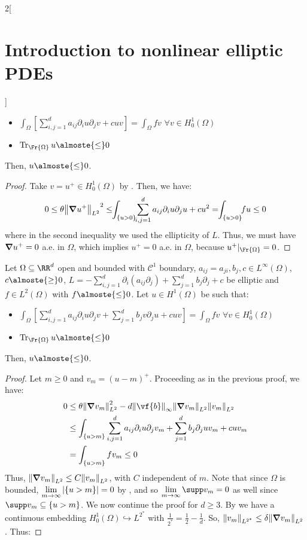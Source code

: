 \documentclass[../../../main_math.tex]{subfiles}
\begin{document}
\begin{multicols}{2}[\section{Introduction to nonlinear elliptic PDEs}]
\begin{theorem}
    \begin{itemize}
      \item $\displaystyle \int_\Omega\left[\sum_{i,j=1}^da_{ij}\partial_iu\partial_jv+cuv\right]=\int_\Omega fv$ $\forall v\in H^1_0(\Omega)$
      \item $\Tr_{\Fr{\Omega}}u\almoste{\leq}0$
    \end{itemize}
    Then, $u\almoste{\leq}0$.
  \end{theorem}
  \begin{proof}
    Take $v=u^+\in H^1_0(\Omega)$ by . Then, we have:
    $$
      0\leq \theta {\norm{\grad u^+}_{L^2}}^2\leq\!\! \int_{\{u>0\}}\!\!\sum_{i,j=1}^d a_{ij}\partial_iu\partial_ju+cu^2=\!\!\int_{\{u>0\}} \!\!fu\leq 0
    $$
    where in the second inequality we used the ellipticity of $L$. Thus, we must have $\grad u^+=0$ a.e. in $\Omega$, which implies $u^+=0$ a.e. in $\Omega$, because $u^+|_{\Fr{\Omega}}=0$.
  \end{proof}
  \begin{theorem}\label{INEPDE:weak_max_principle}
    Let $\Omega\subseteq\RR^d$ open and bounded with $\mathcal{C}^1$ boundary, $a_{ij}=a_{ji},b_j,c\in L^\infty(\Omega)$, $c \almoste{\geq}0$, $L=-\sum_{i,j=1}^d\partial_i(a_{ij}\partial_j)+\sum_{j=1}^db_j\partial_j+c$ be elliptic and $f\in L^2(\Omega)$ with $f\almoste{\leq} 0$. Let $u\in H^1(\Omega)$ be such that:
    \begin{itemize}
      \item $\displaystyle \int_\Omega\left[\sum_{i,j=1}^da_{ij}\partial_iu\partial_jv+ \sum_{j=1}^db_jv\partial_ju+cuv\right]=\int_\Omega fv$ $\forall v\in H^1_0(\Omega)$
      \item $\Tr_{\Fr{\Omega}}u\almoste{\leq}0$
    \end{itemize}
    Then, $u\almoste{\leq}0$.
  \end{theorem}
  \begin{proof}
    Let $m\geq 0$ and $v_m={(u-m)}^+$. Proceeding as in the previous proof, we have:
    \begin{align*}
      0 & \leq \theta \norm{\grad v_m}_{L^2}^2-d\norm{\vf{b}}_\infty\norm{\grad v_m}_{L^2}\norm{v_m}_{L^2}       \\
        & \leq \int_{\{u>m\}}\sum_{i,j=1}^d a_{ij}\partial_iu\partial_jv_m+\sum_{j=1}^db_j\partial_ju v_m+cu v_m \\
        & =\int_{\{u>m\}}fv_m\leq 0
    \end{align*}
    Thus, $\norm{\grad v_m}_{L^2}\leq C \norm{v_m}_{L^2}$, with $C$ independent of $m$. Note that since $\Omega$ is bounded, $\displaystyle\lim_{m\to\infty}\abs{\{u>m\}}=0$ by , and so $\displaystyle\lim_{m\to\infty}\supp v_m=0$ as well since $\supp v_m\subseteq \{u>m\}$. We now continue the proof for $d\geq 3$. By  we have a continuous embedding $H_0^1(\Omega)\hookrightarrow L^{2^*}$ with $\frac{1}{2^*}=\frac{1}{2}-\frac{1}{d}$. So, $\norm{v_m}_{L^{2^*}}\leq \delta \norm{\grad v_m}_{L^2}$. Thus:

\end{proof}
\end{multicols}
\end{document}

